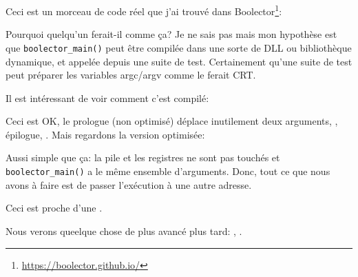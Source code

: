 \label{Boolector}

Ceci est un morceau de code réel que j'ai trouvé dans Boolector\footnote{\url{https://boolector.github.io/}}:



Pourquoi quelqu'un ferait-il comme ça?
Je ne sais pas mais mon hypothèse est que \verb|boolector_main()| peut être compilée
dans une sorte de DLL ou bibliothèque dynamique, et appelée depuis une suite de test.
Certainement qu'une suite de test peut préparer les variables argc/argv comme
le ferait \ac{CRT}.

Il est intéressant de voir comment c'est compilé:



Ceci est OK, le prologue (non optimisé) déplace inutilement deux arguments,
, épilogue, .
Mais regardons la version optimisée:



Aussi simple que ça: la pile et les registres ne sont pas touchés et \verb|boolector_main()|
a le même ensemble d'arguments.
Donc, tout ce que nous avons à faire est de passer l'exécution à une autre adresse.

Ceci est proche d'une .

Nous verons queelque chose de plus avancé plus tard: , .
